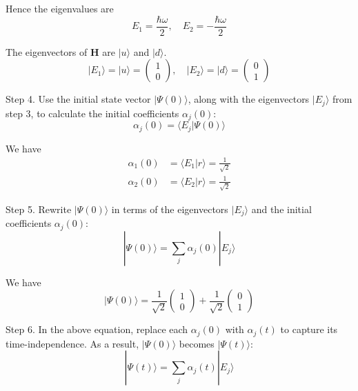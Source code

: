 Hence the eigenvalues are
\begin{equation*}
E_1=\frac{\hbar\omega}{2},
\quad
E_2=-\frac{\hbar\omega}{2}
\end{equation*}

The eigenvectors of $\mathbf H$ are $|u\rangle$ and $|d\rangle$.
\begin{equation*}
|E_1\rangle=|u\rangle=\begin{pmatrix}1\\0\end{pmatrix},
\quad
|E_2\rangle=|d\rangle=\begin{pmatrix}0\\1\end{pmatrix}
\end{equation*}

Step 4.
Use the initial state vector $|\Psi(0)\rangle$,
along with the eigenvectors $|E_j\rangle$ from step 3,
to calculate the initial coefficients $\alpha_j(0)$:
\begin{equation*}
\alpha_j(0)=\langle E_j|\Psi(0)\rangle
\end{equation*}

We have
\begin{align*}
\alpha_1(0)&=\langle E_1|r\rangle=\frac{1}{\sqrt2}
\\[1ex]
\alpha_2(0)&=\langle E_2|r\rangle=\frac{1}{\sqrt2}
\end{align*}

Step 5.
Rewrite $|\Psi(0)\rangle$ in terms of the eigenvectors $|E_j\rangle$ and
the initial coefficients $\alpha_j(0)$:
\begin{equation*}
|\Psi(0)\rangle=\sum_j\alpha_j(0)|E_j\rangle
\end{equation*}

We have
\begin{equation*}
|\Psi(0)\rangle
=\frac{1}{\sqrt2}\begin{pmatrix}1\\0\end{pmatrix}
+\frac{1}{\sqrt2}\begin{pmatrix}0\\1\end{pmatrix}
\end{equation*}

Step 6.
In the above equation, replace each $\alpha_j(0)$ with $\alpha_j(t)$
to capture its time-independence.
As a result, $|\Psi(0)\rangle$ becomes $|\Psi(t)\rangle$:
\begin{equation*}
|\Psi(t)\rangle=\sum_j\alpha_j(t)|E_j\rangle
\end{equation*}

